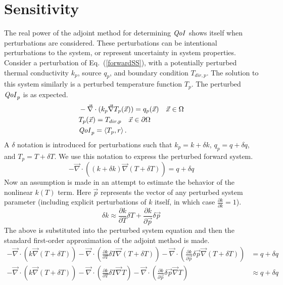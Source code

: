 \documentclass{article}
\newcommand{\vx}{\vec{x}}
\newcommand{\vp}{\vec{p}}
\newcommand{\bra}{\left\langle}
\newcommand{\ket}{\right\rangle}
\renewcommand{\div}{\vec{\nabla} \cdot}
\newcommand{\grad}{\vec{\nabla}}
\newcommand{\qoi}{{\it QoI}\xspace}
\newcommand{\Tdirp}{T_{dir,p}}
\begin{document}
\section{Sensitivity}
The real power of the adjoint method for determining $\qoi$ shows itself when perturbations are considered. These perturbations can be intentional perturbations to the system, or represent uncertainty in system properties. Consider a perturbation of Eq.~(\ref{forwardSS}), with a potentially perturbed thermal conductivity $k_p$, source $q_p$, and boundary condition $\Tdirp$. The solution to this system similarly is a perturbed temperature function $T_p$. The perturbed $\qoi_p$ is as expected.
\begin{equation}
\label{forwardSSpert}
\begin{split}
& - \div ( k_p \grad T_p(\vx) ) = q_p(\vx) \quad \vx \in \Omega \\
&T_p(\vx)=\Tdirp \quad \vx \in \partial \Omega \\
&\qoi_p = \bra T_p , r \ket.
\end{split}
\end{equation}
A $\delta$ notation is introduced for perturbations such that $k_p = k + \delta k$, $q_p = q + \delta q$, and $T_p =  T + \delta T$. We use this notation to express the perturbed forward system.
\begin{equation}
- \div ( (k+\delta k) \grad (T + \delta T) ) = q + \delta q 
\end{equation}
Now an assumption is made in an attempt to estimate the behavior of the nonlinear $k(T)$ term. Here $\vp$ represents the vector of any perturbed system parameter (including explicit perturbations of $k$ itself, in which case $\frac{\partial k}{\partial k} = 1$). 
\begin{equation}
\delta k \approx \frac{\partial k}{\partial T} \delta T + \frac{\partial k}{\partial \vp} \delta \vp
\end{equation}
The above is substituted into the perturbed system equation and then the standard first-order approximation of the adjoint method is made.
\begin{align}
- \div ( k \grad (T + \delta T) ) - \div ( \frac{\partial k}{\partial T} \delta T \grad (T + \delta T) ) - \div ( \frac{\partial k}{\partial \vp} \delta \vp \grad (T + \delta T) ) &= q + \delta q \\
- \div ( k \grad (T + \delta T) ) - \div ( \frac{\partial k}{\partial T} \delta T \grad T  ) - \div ( \frac{\partial k}{\partial \vp} \delta \vp \grad T ) & \approx q + \delta q 
\end{align}
\end{document}
